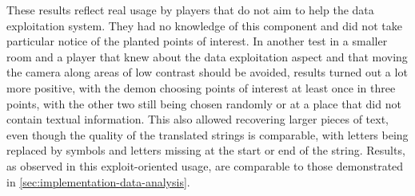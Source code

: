 These results reflect real usage by players that do not aim to help the data exploitation system.
They had no knowledge of this component and did not take particular notice of the planted points of interest.
In another test in a smaller room and a player that knew about the data exploitation aspect and that moving the camera along areas of low contrast should be avoided, results turned out a lot more positive, with the demon choosing points of interest at least once in three points, with the other two still being chosen randomly or at a place that did not contain textual information.
This also allowed recovering larger pieces of text, even though the quality of the translated strings is comparable, with letters being replaced by symbols and letters missing at the start or end of the string.
Results, as observed in this exploit-oriented usage, are comparable to those demonstrated in \autoref{sec:implementation-data-analysis}.



